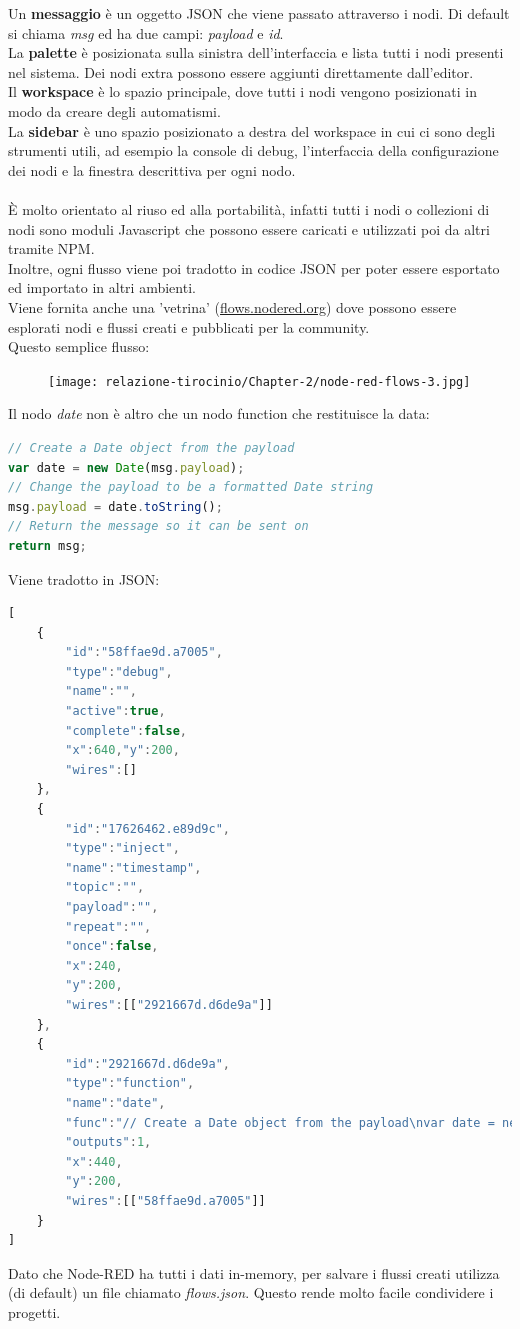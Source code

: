 \documentclass[a4paper,10pt]{memoir}
\begin{document}
Un \textbf{messaggio} è un oggetto JSON che viene passato attraverso i nodi. Di default si chiama \textit{msg} ed ha due campi: \textit{payload} e \textit{id}. 
\\
La \textbf{palette} è posizionata sulla sinistra dell'interfaccia e lista tutti i nodi presenti nel sistema. Dei nodi extra possono essere aggiunti direttamente dall'editor.
\\
Il \textbf{workspace} è lo spazio principale, dove tutti i nodi vengono posizionati in modo da creare degli automatismi.
\\
La \textbf{sidebar} è uno spazio posizionato a destra del workspace in cui ci sono degli strumenti utili, ad esempio la console di debug, l'interfaccia della configurazione dei nodi e la finestra descrittiva per ogni nodo.
\\
\\
È molto orientato al riuso ed alla portabilità, infatti tutti i nodi o collezioni di nodi sono moduli Javascript che possono essere caricati e utilizzati poi da altri tramite NPM.
\\
Inoltre, ogni flusso viene poi tradotto in codice JSON per poter essere esportato ed importato in altri ambienti.
\\
Viene fornita anche una 'vetrina' (\href{https://flows.nodered.org}{flows.nodered.org}) dove possono essere esplorati nodi e flussi creati e pubblicati per la community.
\\
Questo semplice flusso:
\begin{figure}[H]
\texttt{[image: relazione-tirocinio/Chapter-2/node-red-flows-3.jpg]}
\end{figure}
Il nodo \textit{date} non è altro che un nodo function che restituisce la data:
\begin{lstlisting}[language=JavaScript]
// Create a Date object from the payload
var date = new Date(msg.payload);
// Change the payload to be a formatted Date string
msg.payload = date.toString();
// Return the message so it can be sent on
return msg;
\end{lstlisting}
Viene tradotto in JSON:
\begin{lstlisting}[language=JavaScript]
[
    {
        "id":"58ffae9d.a7005",
        "type":"debug",
        "name":"",
        "active":true,
        "complete":false,
        "x":640,"y":200,
        "wires":[]
    },
    {
        "id":"17626462.e89d9c",
        "type":"inject",
        "name":"timestamp",
        "topic":"",
        "payload":"",
        "repeat":"",
        "once":false,
        "x":240,
        "y":200,
        "wires":[["2921667d.d6de9a"]]
    },
    {
        "id":"2921667d.d6de9a",
        "type":"function",
        "name":"date",
        "func":"// Create a Date object from the payload\nvar date = new Date(msg.payload);\n// Change the payload to be a formatted Date string\nmsg.payload = date.toString();\n// Return the message so it can be sent on\nreturn msg;",
        "outputs":1,
        "x":440,
        "y":200,
        "wires":[["58ffae9d.a7005"]]
    }
]
\end{lstlisting}
Dato che Node-RED ha tutti i dati in-memory, per salvare i flussi creati utilizza (di default) un file chiamato \textit{flows.json}. Questo rende molto facile condividere i progetti.
\end{document}
